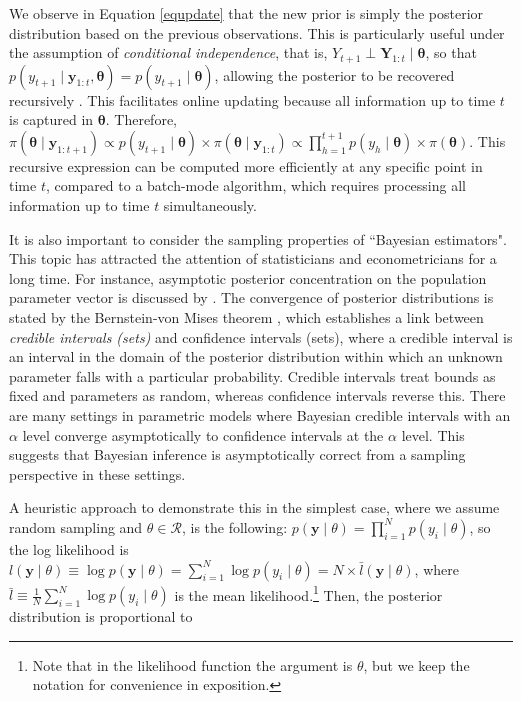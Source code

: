 We observe in Equation \ref{equpdate} that the new prior is simply the posterior distribution based on the previous observations. This is particularly useful under the assumption of \textit{conditional independence}, that is, $Y_{t+1} \perp \mathbf{Y}_{1:t} \mid \bm{\theta}$, so that $p(y_{t+1} \mid \mathbf{y}_{1:t}, \bm{\theta}) = p(y_{t+1} \mid \bm{\theta})$, allowing the posterior to be recovered recursively \cite{petris2009dynamic}. This facilitates online updating because all information up to time $t$ is captured in $\bm{\theta}$. Therefore, $\pi(\bm{\theta} \mid \mathbf{y}_{1:t+1}) \propto p(y_{t+1} \mid \bm{\theta}) \times \pi(\bm{\theta} \mid \mathbf{y}_{1:t}) \propto \prod_{h=1}^{t+1} p(y_h \mid \bm{\theta}) \times \pi(\bm{\theta})$. This recursive expression can be computed more efficiently at any specific point in time $t$, compared to a batch-mode algorithm, which requires processing all information up to time $t$ simultaneously.

It is also important to consider the sampling properties of ``Bayesian estimators". This topic has attracted the attention of statisticians and econometricians for a long time. For instance, asymptotic posterior concentration on the population parameter vector is discussed by \cite{bickel1969some}. The convergence of posterior distributions is stated by the Bernstein-von Mises theorem \cite{Lehmann2003,van2000asymptotic}, which establishes a link between \textit{credible intervals (sets)} and confidence intervals (sets), where a credible interval is an interval in the domain of the posterior distribution within which an unknown parameter falls with a particular probability. Credible intervals treat bounds as fixed and parameters as random, whereas confidence intervals reverse this. There are many settings in parametric models where Bayesian credible intervals with an $\alpha$ level converge asymptotically to confidence intervals at the $\alpha$ level. This suggests that Bayesian inference is asymptotically correct from a sampling perspective in these settings.

A heuristic approach to demonstrate this in the simplest case, where we assume random sampling and $\theta \in \mathcal{R}$, is the following: $p(\mathbf{y} \mid \theta) = \prod_{i=1}^N p(y_i \mid \theta)$, so the log likelihood is $l(\mathbf{y} \mid \theta) \equiv \log p(\mathbf{y} \mid \theta) = \sum_{i=1}^N \log p(y_i \mid \theta) = N \times \bar{l}(\mathbf{y} \mid \theta)$, where $\bar{l} \equiv \frac{1}{N} \sum_{i=1}^N \log p(y_i \mid \theta)$ is the mean likelihood.\footnote{Note that in the likelihood function the argument is $\theta$, but we keep the notation for convenience in exposition.} Then, the posterior distribution is proportional to

